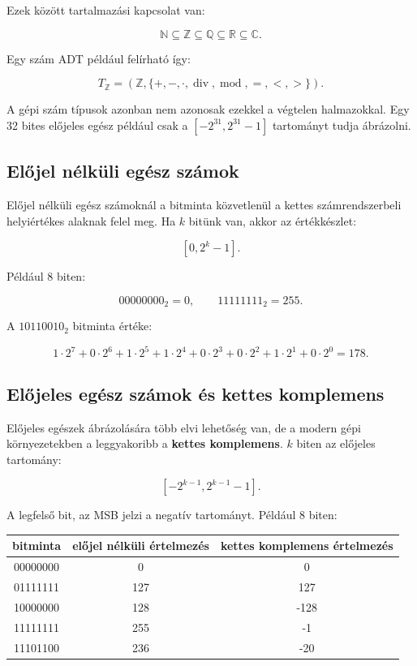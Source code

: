 Ezek között tartalmazási kapcsolat van:

\[
\mathbb{N}\subseteq\mathbb{Z}\subseteq\mathbb{Q}\subseteq\mathbb{R}\subseteq\mathbb{C}.
\]

Egy szám ADT például felírható így:

\[
T_{\mathbb{Z}}=(\mathbb{Z},\{+,-,\cdot,\operatorname{div},\operatorname{mod},=,<,>\}).
\]

A gépi szám típusok azonban nem azonosak ezekkel a végtelen halmazokkal. Egy 32 bites előjeles egész például csak a $[-2^{31},2^{31}-1]$ tartományt tudja ábrázolni.

\subsection{Előjel nélküli egész számok}

Előjel nélküli egész számoknál a bitminta közvetlenül a kettes számrendszerbeli helyiértékes alaknak felel meg. Ha $k$ bitünk van, akkor az értékkészlet:

\[
[0,2^k-1].
\]

Például 8 biten:

\[
00000000_2=0,\qquad 11111111_2=255.
\]

A $10110010_2$ bitminta értéke:

\[
1\cdot2^7+0\cdot2^6+1\cdot2^5+1\cdot2^4+0\cdot2^3+0\cdot2^2+1\cdot2^1+0\cdot2^0=178.
\]

\subsection{Előjeles egész számok és kettes komplemens}

Előjeles egészek ábrázolására több elvi lehetőség van, de a modern gépi környezetekben a leggyakoribb a \textbf{kettes komplemens}. $k$ biten az előjeles tartomány:

\[
[-2^{k-1},2^{k-1}-1].
\]

A legfelső bit, az MSB jelzi a negatív tartományt. Például 8 biten:

\begin{center}
\begin{tabular}{c|c|c}
bitminta & előjel nélküli értelmezés & kettes komplemens értelmezés \\
\midrule
00000000 & 0 & 0 \\
01111111 & 127 & 127 \\
10000000 & 128 & -128 \\
11111111 & 255 & -1 \\
11101100 & 236 & -20 \\
\end{tabular}
\end{center}

